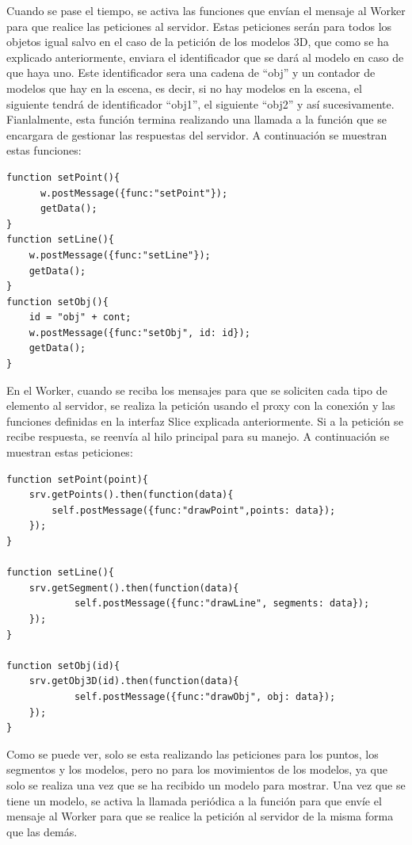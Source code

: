 Cuando se pase el tiempo, se activa las funciones que envían el mensaje al Worker para que realice las peticiones al servidor. Estas peticiones serán para todos los objetos igual salvo en el caso de la petición de los modelos 3D, que como se ha explicado anteriormente, enviara el identificador que se dará al modelo en caso de que haya uno. Este identificador sera una cadena de ``obj'' y un contador de modelos que hay en la escena, es decir, si no hay modelos en la escena, el siguiente tendrá de identificador ``obj1'', el siguiente ``obj2'' y así sucesivamente. Fianlalmente, esta función termina realizando una llamada a la función que se encargara de gestionar las respuestas del servidor. A continuación se muestran estas funciones:

\begin{lstlisting}[frame=single]
function setPoint(){
      w.postMessage({func:"setPoint"});
      getData();
}
function setLine(){
	w.postMessage({func:"setLine"});
	getData();
}
function setObj(){
	id = "obj" + cont;
	w.postMessage({func:"setObj", id: id});
	getData();
}
\end{lstlisting}

En el Worker, cuando se reciba los mensajes para que se soliciten cada tipo de elemento al servidor, se realiza la petición usando el proxy con la conexión y las funciones definidas en la interfaz Slice explicada anteriormente. Si a la petición se recibe respuesta, se reenvía al hilo principal para su manejo. A continuación se muestran estas peticiones:

\begin{lstlisting}[frame=single]
function setPoint(point){
 	srv.getPoints().then(function(data){
		self.postMessage({func:"drawPoint",points: data});
	});
}

function setLine(){
	srv.getSegment().then(function(data){
      		self.postMessage({func:"drawLine", segments: data});
  	});
}

function setObj(id){
  	srv.getObj3D(id).then(function(data){
    		self.postMessage({func:"drawObj", obj: data});
  	});
}
\end{lstlisting}

Como se puede ver, solo se esta realizando las peticiones para los puntos, los segmentos y los modelos, pero no para los movimientos de los modelos, ya que solo se realiza una vez que se ha recibido un modelo para mostrar. Una vez que se tiene un modelo, se activa la llamada periódica a la función para que envíe el mensaje al Worker para que se realice la petición al servidor de la misma forma que las demás.

